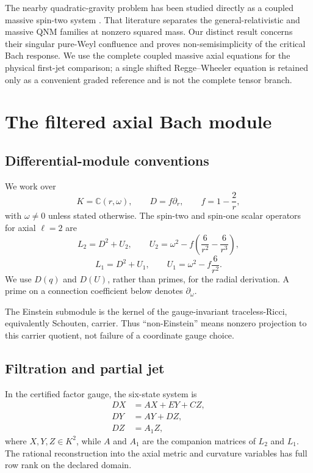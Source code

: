 \documentclass[11pt]{article}
\theoremstyle{remark}
\newcommand{\C}{\mathbb C}
\begin{document}
The nearby quadratic-gravity problem has been studied directly as a
coupled massive spin-two system \cite{britocardosopani2013,antoniou2025}.
That literature separates the general-relativistic and massive QNM
families at nonzero squared mass.  Our distinct result concerns their
singular pure-Weyl confluence and proves non-semisimplicity of the critical
Bach response.  We use the complete coupled massive axial equations for
the physical first-jet comparison; a single shifted Regge--Wheeler
equation is retained only as a convenient graded reference and is not the
complete tensor branch.

\section{The filtered axial Bach module}
\label{sec:filtration}

\subsection{Differential-module conventions}

We work over
\[
 K=\C(r,\omega),\qquad
 D=f\partial_r,\qquad
 f=1-\frac2r,
\]
with \(\omega\ne0\) unless stated otherwise.  The spin-two and spin-one
scalar operators for axial \(\ell=2\) are
\[
 L_2=D^2+U_2,\qquad
 U_2=\omega^2-f\left(\frac6{r^2}-\frac6{r^3}\right),
\]
\[
 L_1=D^2+U_1,\qquad
 U_1=\omega^2-f\frac6{r^2}.
\]
We use \(D(q)\) and \(D(U)\), rather than primes, for the radial
derivation.  A prime on a connection coefficient below denotes
\(\partial_\omega\).

The Einstein submodule is the kernel of the gauge-invariant
traceless-Ricci, equivalently Schouten, carrier.  Thus ``non-Einstein''
means nonzero projection to this carrier quotient, not failure of a
coordinate gauge choice.

\subsection{Filtration and partial jet}

In the certified factor gauge, the six-state system is
\begin{equation}\label{eq:six-state}
\begin{aligned}
 DX&=AX+EY+CZ,\\
 DY&=AY+DZ,\\
 DZ&=A_1Z,
\end{aligned}
\end{equation}
where \(X,Y,Z\in K^2\), while \(A\) and \(A_1\) are the companion
matrices of \(L_2\) and \(L_1\).  The rational reconstruction into the
axial metric and curvature variables has full row rank on the declared
domain.
\end{document}
